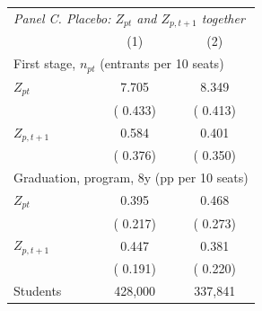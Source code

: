 \begin{tabular}{lcc}
\toprule
\multicolumn{3}{l}{\textit{Panel C. Placebo: \(Z_{pt}\) and \(Z_{p,t+1}\) together}} \\
 & (1) & (2) \\
\midrule
\multicolumn{3}{l}{First stage, \(n_{pt}\) (entrants per 10 seats)} \\
\quad \(Z_{pt}\) &   7.705\sym{***} &   8.349\sym{***} \\
 & ( 0.433) & ( 0.413) \\
\quad \(Z_{p,t+1}\) &   0.584 &   0.401 \\
 & ( 0.376) & ( 0.350) \\
\multicolumn{3}{l}{Graduation, program, 8y (pp per 10 seats)} \\
\quad \(Z_{pt}\) &   0.395\sym{*} &   0.468\sym{*} \\
 & ( 0.217) & ( 0.273) \\
\quad \(Z_{p,t+1}\) &   0.447\sym{**} &   0.381\sym{*} \\
 & ( 0.191) & ( 0.220) \\
\midrule
Students &   428,000 &   337,841 \\
\bottomrule
\end{tabular}
